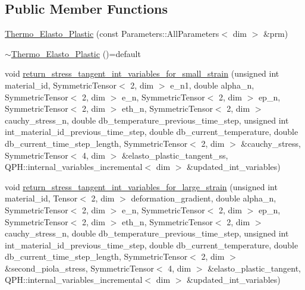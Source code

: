 \subsection*{Public Member Functions}
\begin{DoxyCompactItemize}
\item 
\hyperlink{classConstitutive__Laws_1_1Thermo__Elasto__Plastic_a341bfb61aa9e1c3c95a2e423730e397c}{Thermo\+\_\+\+Elasto\+\_\+\+Plastic} (const Parameters\+::\+All\+Parameters$<$ dim $>$ \&prm)
\item 
\hyperlink{classConstitutive__Laws_1_1Thermo__Elasto__Plastic_aee70cb50dfcb1f4d3f3525b870c1f982}{$\sim$\+Thermo\+\_\+\+Elasto\+\_\+\+Plastic} ()=default
\item 
void \hyperlink{classConstitutive__Laws_1_1Thermo__Elasto__Plastic_a1d4b992d9e803ccfbd56d344f9ca7e41}{return\+\_\+stress\+\_\+tangent\+\_\+int\+\_\+variables\+\_\+for\+\_\+small\+\_\+strain} (unsigned int material\+\_\+id, Symmetric\+Tensor$<$ 2, dim $>$ e\+\_\+n1, double alpha\+\_\+n, Symmetric\+Tensor$<$ 2, dim $>$ e\+\_\+n, Symmetric\+Tensor$<$ 2, dim $>$ ep\+\_\+n, Symmetric\+Tensor$<$ 2, dim $>$ eth\+\_\+n, Symmetric\+Tensor$<$ 2, dim $>$ cauchy\+\_\+stress\+\_\+n, double db\+\_\+temperature\+\_\+previous\+\_\+time\+\_\+step, unsigned int int\+\_\+material\+\_\+id\+\_\+previous\+\_\+time\+\_\+step, double db\+\_\+current\+\_\+temperature, double db\+\_\+current\+\_\+time\+\_\+step\+\_\+length, Symmetric\+Tensor$<$ 2, dim $>$ \&cauchy\+\_\+stress, Symmetric\+Tensor$<$ 4, dim $>$ \&elasto\+\_\+plastic\+\_\+tangent\+\_\+ss, Q\+P\+H\+::internal\+\_\+variables\+\_\+incremental$<$ dim $>$ \&updated\+\_\+int\+\_\+variables)
\item 
void \hyperlink{classConstitutive__Laws_1_1Thermo__Elasto__Plastic_a4edcd1aa7b22b47c8522c7bc5f2b211e}{return\+\_\+stress\+\_\+tangent\+\_\+int\+\_\+variables\+\_\+for\+\_\+large\+\_\+strain} (unsigned int material\+\_\+id, Tensor$<$ 2, dim $>$ deformation\+\_\+gradient, double alpha\+\_\+n, Symmetric\+Tensor$<$ 2, dim $>$ e\+\_\+n, Symmetric\+Tensor$<$ 2, dim $>$ ep\+\_\+n, Symmetric\+Tensor$<$ 2, dim $>$ eth\+\_\+n, Symmetric\+Tensor$<$ 2, dim $>$ cauchy\+\_\+stress\+\_\+n, double db\+\_\+temperature\+\_\+previous\+\_\+time\+\_\+step, unsigned int int\+\_\+material\+\_\+id\+\_\+previous\+\_\+time\+\_\+step, double db\+\_\+current\+\_\+temperature, double db\+\_\+current\+\_\+time\+\_\+step\+\_\+length, Symmetric\+Tensor$<$ 2, dim $>$ \&second\+\_\+piola\+\_\+stress, Symmetric\+Tensor$<$ 4, dim $>$ \&elasto\+\_\+plastic\+\_\+tangent, Q\+P\+H\+::internal\+\_\+variables\+\_\+incremental$<$ dim $>$ \&updated\+\_\+int\+\_\+variables)
\end{DoxyCompactItemize}
